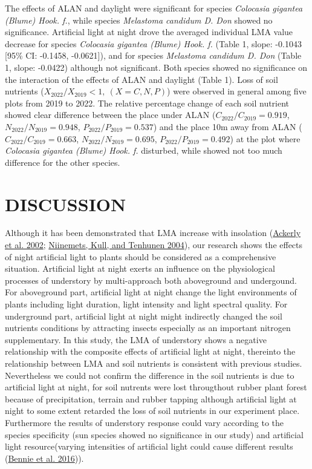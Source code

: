 \documentclass[
  letterpaper,
  DIV=11,
  numbers=noendperiod]{scrartcl}
\begin{document}
The effects of ALAN and daylight were significant for species
\emph{Colocasia gigantea (Blume) Hook. f.}, while species
\emph{Melastoma candidum D. Don} showed no significance. Artificial
light at night drove the averaged individual LMA value decrease for
species \emph{Colocasia gigantea (Blume) Hook. f.} (Table 1, slope:
-0.1043 {[}95\% CI: -0.1458, -0.0621{]}), and for species
\emph{Melastoma candidum D. Don} (Table 1, slope: -0.0422) although not
significant. Both species showed no significance on the interaction of
the effects of ALAN and daylight (Table 1). Loss of soil nutrients
(\(X_{2022}/X_{2019} < 1,\ (X = C,N,P)\)) were observed in general among
five plots from 2019 to 2022. The relative percentage change of each
soil nutrient showed clear difference between the place under ALAN
(\(C_{2022}/C_{2019} = 0.919\), \(N_{2022}/N_{2019} = 0.948\),
\(P_{2022}/P_{2019} = 0.537\)) and the place 10m away from ALAN
(\(C_{2022}/C_{2019} = 0.663\), \(N_{2022}/N_{2019} = 0.695\),
\(P_{2022}/P_{2019} = 0.492\)) at the plot where \emph{Colocasia
gigantea (Blume) Hook. f.} disturbed, while showed not too much
difference for the other species.

\hypertarget{discussion}{%
\section{DISCUSSION}\label{discussion}}

Although it has been demonstrated that LMA increase with insolation
(\protect\hyperlink{ref-Ackerly2002}{Ackerly et al. 2002};
\protect\hyperlink{ref-Niinemets2004}{Niinemets, Kull, and Tenhunen
2004}), our research shows the effects of night artificial light to
plants should be considered as a comprehensive situation. Artificial
light at night exerts an influence on the physiological processes of
understory by multi-approach both aboveground and undergound. For
aboveground part, artificial light at night change the light
environments of plants including light duration, light intensity and
light spectral quality. For underground part, artificial light at night
might indirectly changed the soil nutrients conditions by attracting
insects especially as an important nitrogen supplementary. In this
study, the LMA of understory shows a negative relationship with the
composite effects of artificial light at night, thereinto the
relationship between LMA and soil nutrients is consistent with previous
studies. Nevertheless we could not confirm the difference in the soil
nutrients is due to artificial light at night, for soil nutrents were
lost througthout rubber plant forest because of precipitation, terrain
and rubber tapping although artificial light at night to some extent
retarded the loss of soil nutrients in our experiment place. Furthermore
the results of understory response could vary according to the species
specificity (sun species showed no significance in our study) and
artificial light resource(varying intensities of artificial light could
cause different results (\protect\hyperlink{ref-Bennie2016}{Bennie et
al. 2016})).
\end{document}
